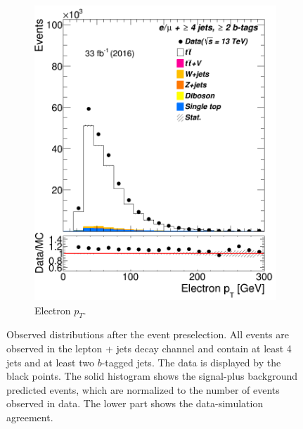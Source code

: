 \begin{figure} [b]
\begin{subfigure}{0.25\textwidth}
 	\includegraphics[width=\linewidth]{ControlPlots_emujets_2016_4incl_2incl/el_pt_emujets_2016.png}
 	\caption{Electron $p_T$.} \label{fig:Sec13}
 \end{subfigure}
 
 
 	
	\caption{Observed distributions after the event preselection. All events are observed in the lepton + jets decay channel and contain at least 4 jets and at least two $b$-tagged jets. The data is displayed by the black points. The solid histogram shows the signal-plus background predicted events, which are normalized to the number of events observed in data. The lower part shows the data-simulation agreement.}
	\label{fig:Sel1}
\end{figure}	


